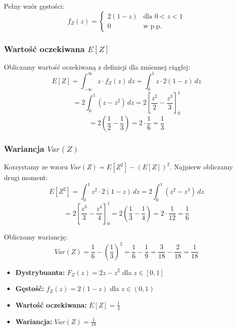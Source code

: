Pełny wzór gęstości:
\[
	f_Z(z) = \begin{cases}
		2(1-z) & \text{dla } 0 < z < 1 \\
		0      & \text{w p.p.}
	\end{cases}
\]

\subsubsection*{Wartość oczekiwana \(E[Z]\)}
Obliczamy wartość oczekiwaną z definicji dla zmiennej ciągłej:
\[ E[Z] = \int_{-\infty}^{\infty} z \cdot f_Z(z) \, dz = \int_{0}^{1} z \cdot 2(1-z) \, dz \]
\[ = 2 \int_{0}^{1} (z - z^2) \, dz = 2 \left[ \frac{z^2}{2} - \frac{z^3}{3} \right]_0^1 \]
\[ = 2 \left( \frac{1}{2} - \frac{1}{3} \right) = 2 \cdot \frac{1}{6} = \frac{1}{3} \]

\subsubsection*{Wariancja \(Var(Z)\)}
Korzystamy ze wzoru \(Var(Z) = E[Z^2] - (E[Z])^2\). Najpierw obliczamy drugi moment:
\[ E[Z^2] = \int_{0}^{1} z^2 \cdot 2(1-z) \, dz = 2 \int_{0}^{1} (z^2 - z^3) \, dz \]
\[ = 2 \left[ \frac{z^3}{3} - \frac{z^4}{4} \right]_0^1 = 2 \left( \frac{1}{3} - \frac{1}{4} \right) = 2 \cdot \frac{1}{12} = \frac{1}{6} \]

Obliczamy wariancję:
\[ Var(Z) = \frac{1}{6} - \left(\frac{1}{3}\right)^2 = \frac{1}{6} - \frac{1}{9} = \frac{3}{18} - \frac{2}{18} = \frac{1}{18} \]


\begin{itemize}
	\item \textbf{Dystrybuanta:} \(F_Z(z) = 2z - z^2\) dla \(z \in [0,1]\)
	\item \textbf{Gęstość:} \(f_Z(z) = 2(1-z)\) dla \(z \in (0,1)\)
	\item \textbf{Wartość oczekiwana:} \(E[Z] = \frac{1}{3}\)
	\item \textbf{Wariancja:} \(Var(Z) = \frac{1}{18}\)
\end{itemize}